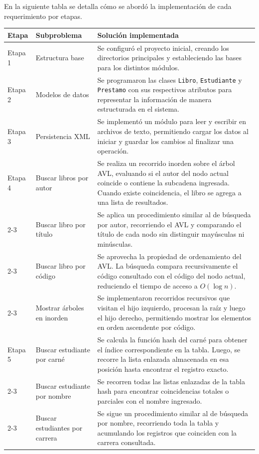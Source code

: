 \documentclass[11pt]{article}
\begin{document}
En la siguiente tabla se detalla cómo se abordó la implementación de cada requerimiento por etapas.

\begin{longtable}{p{} p{} p{}}
\toprule
\textbf{Etapa} & \textbf{Subproblema} & \textbf{Solución implementada} \\
\midrule

Etapa 1 
& Estructura base & Se configuró el proyecto inicial, creando los directorios principales y estableciendo las bases para los distintos módulos. \\
\midrule

Etapa 2 
& Modelos de datos & Se programaron las clases \texttt{Libro}, \texttt{Estudiante} y \texttt{Prestamo} con sus respectivos atributos para representar la información de manera estructurada en el sistema. \\
\midrule

Etapa 3 
& Persistencia XML & Se implementó un módulo para leer y escribir en archivos de texto, permitiendo cargar los datos al iniciar y guardar los cambios al finalizar una operación. \\
\midrule

Etapa 4
& Buscar libros por autor & Se realiza un recorrido inorden sobre el árbol AVL, evaluando si el autor del nodo actual coincide o contiene la subcadena ingresada. Cuando existe coincidencia, el libro se agrega a una lista de resultados. \\
\cmidrule{2-3}
& Buscar libro por título & Se aplica un procedimiento similar al de búsqueda por autor, recorriendo el AVL y comparando el título de cada nodo sin distinguir mayúsculas ni minúsculas. \\
\cmidrule{2-3}
& Buscar libro por código & Se aprovecha la propiedad de ordenamiento del AVL. La búsqueda compara recursivamente el código consultado con el código del nodo actual, reduciendo el tiempo de acceso a $O(\log n)$. \\
\cmidrule{2-3}
& Mostrar árboles en inorden & Se implementaron recorridos recursivos que visitan el hijo izquierdo, procesan la raíz y luego el hijo derecho, permitiendo mostrar los elementos en orden ascendente por código. \\
\midrule

Etapa 5
& Buscar estudiante por carné & Se calcula la función hash del carné para obtener el índice correspondiente en la tabla. Luego, se recorre la lista enlazada almacenada en esa posición hasta encontrar el registro exacto. \\
\cmidrule{2-3}
& Buscar estudiante por nombre & Se recorren todas las listas enlazadas de la tabla hash para encontrar coincidencias totales o parciales con el nombre ingresado. \\
\cmidrule{2-3}
& Buscar estudiantes por carrera & Se sigue un procedimiento similar al de búsqueda por nombre, recorriendo toda la tabla y acumulando los registros que coinciden con la carrera consultada. \\
\midrule


\end{longtable}
\end{document}
